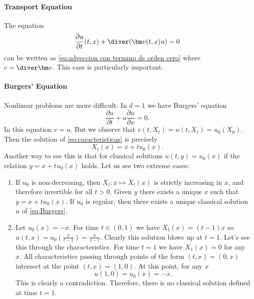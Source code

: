\paragraph{Transport Equation}
The equation
\begin{equation}
    \frac{\partial u}{\partial t} (t,x) + \diver( \bm v(t,x) u) = 0
\end{equation}
can be written as \eqref{eq:adveccion con termino de orden cero} where $c = \diver \bm v$. This case is particularly important.

\paragraph{Burgers' Equation}

Nonlinear problems are more difficult. In $d=1$ we have Burgers' equation
\begin{equation}
    \label{eq:Burgers}
    \frac{\partial u}{\partial t} + u \frac{\partial u}{\partial x} = 0.
\end{equation}
In this equation $v = u$. But we observe that $v(t,X_t) = u(t,X_t) = u_0(X_0)$. Then the solution of \eqref{eq:caracteristicas} is precisely
\begin{equation*}
    X_t (x) = x + t u_0(x).
\end{equation*}
Another way to see this is that for classical solutions $u(t,y) = u_0(x)$ if the relation $y = x + t u_0(x)$ holds.
Let us see two extreme cases:
\begin{enumerate}
    \item If $u_0$ is non-decreasing, then $X_t : x \mapsto X_t (x)$ is strictly increasing in $x$, and therefore invertible for all $t > 0$. Given $y$ there exists a unique $x$ such that $y = x + t u_0(x)$. If $u_0$ is regular, then there exists a unique classical solution $u$ of \eqref{eq:Burgers}.

    \item Let $u_0(x) = -x$.
          For time $t \in (0,1)$ we have $X_t(x) = (t-1)x$ so $u(t,x) = u_0( \frac{x}{t-1} ) = \frac{x}{1-t}$. Clearly this solution blows up at $t = 1$.
          Let's see this through the characteristics.
          For time $t=1$ we have $X_1(x) = 0$ for any $x$. All characteristics passing through points of the form $(t,x) = (0,x)$ intersect at the point $(t,x) = (1,0)$. At this point, for any $x$
          \[
              u(1,0) = u_0(x) = -x.
          \]
          This is clearly a contradiction. Therefore, there is no classical solution defined at time $t = 1$.
\end{enumerate}

